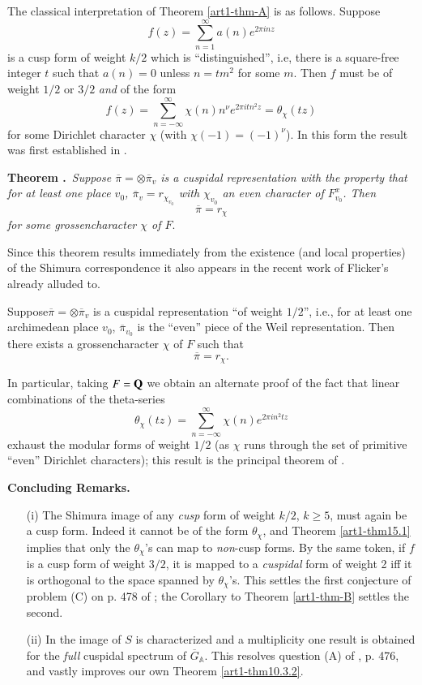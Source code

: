The classical interpretation of Theorem \ref{art1-thm-A} is as follows. Suppose
$$
f(z)=\sum\limits^{\infty}_{n=1}a(n)e^{2\pi inz}
$$
is a cusp form of weight $k/2$ which is ``distinguished'', i.e, there is a square-free integer $t$ such that $a(n)=0$ unless $n=tm^{2}$ for some $m$. Then $f$ must be of weight $1/2$ or $3/2$ {\em and} of the form
$$
f(z)=\sum\limits^{\infty}_{n=-\infty}\chi(n)n^{\nu}e^{2\pi it n^{2}z}=\theta_{\chi}(tz)
$$
for some Dirichlet character $\chi$ (with $\chi(-1)=(-1)^{\nu}$). In this form the result was first established in \cite{Vigneras}.

\medskip
\noindent
{\bf Theorem .\label{art1-thm-B}}~{\em Suppose $\overline{\pi}=\otimes \overline{\pi}_{v}$ is a cuspidal representation with the property that for at least one place $v_{0}$, $\overline{\pi}_{v}=r_{\chi_{v_{0}}}$ with $\chi_{v_{0}}$ an even character of $F^{x}_{v_{0}}$. Then}
$$
\overline{\pi}=r_{\chi}
$$
{\em for some grossencharacter $\chi$ of $F$}.
\smallskip

Since this theorem results immediately from the existence (and local properties) of the Shimura correspondence it also appears in the recent work of Flicker's already alluded to.

\begin{coro*}
Suppose\pageoriginale $\overline{\pi}=\otimes \overline{\pi}_{v}$ is a cuspidal representation ``of weight $1/2$'', i.e., for at least one archimedean place $v_{0}$, $\overline{\pi}_{v_{0}}$ is the ``even'' piece of the Weil representation. Then there exists a grossencharacter $\chi$ of $F$ such that
$$
\overline{\pi}=r_{\chi}.
$$
\end{coro*}

In particular, taking $F=\mathbf{Q}$ we obtain an alternate proof of the fact that linear combinations of the theta-series
$$
\theta_{\chi}(tz)=\sum\limits^{\infty}_{n=-\infty}\chi(n)e^{2\pi in^{2}tz}
$$
exhaust the modular forms of weight $1/2$ (as $\chi$ runs through the set of primitive ``even'' Dirichlet characters); this result is the principal theorem of \cite{Serre-Stark}.

\medskip
\noindent
{\bf Concluding Remarks.}
\smallskip
\begin{itemize}
\item[(i)] The Shimura image of any {\em cusp} form of weight $k/2$, $k\geq 5$, must again be a cusp form. Indeed it cannot be of the form $\theta_{\chi}$, and Theorem \ref{art1-thm15.1} implies that only the $\theta_{\chi}$'s can map to {\em non}-cusp forms. By the same token, if $f$ is a cusp form of weight $3/2$, it is mapped to a {\em cuspidal} form of weight 2 iff it is orthogonal to the space spanned by $\theta_{\chi}$'s. This settles the first conjecture of problem (C) on p. 478 of \cite{Shim}; the Corollary to Theorem \ref{art1-thm-B} settles the second.

\item[(ii)] In \cite{Flicker} the image of $S$ is characterized and a multiplicity one result is obtained for the {\em full} cuspidal spectrum of $\overline{G}_{\mathbb{A}}$. This resolves question (A) of \cite{Shim}, p. 476, and vastly improves our own Theorem \ref{art1-thm10.3.2}.
\end{itemize}

